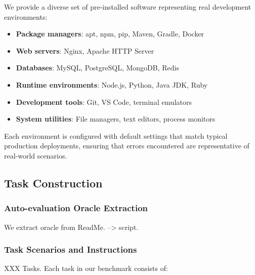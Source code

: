 
We provide a diverse set of pre-installed software representing real development environments:

\begin{itemize}
    \item \textbf{Package managers}: apt, npm, pip, Maven, Gradle, Docker
    \item \textbf{Web servers}: Nginx, Apache HTTP Server
    \item \textbf{Databases}: MySQL, PostgreSQL, MongoDB, Redis
    \item \textbf{Runtime environments}: Node.js, Python, Java JDK, Ruby
    \item \textbf{Development tools}: Git, VS Code, terminal emulators
    \item \textbf{System utilities}: File managers, text editors, process monitors
\end{itemize}

Each environment is configured with default settings that match typical production deployments, ensuring that errors encountered are representative of real-world scenarios.




\subsection{Task Construction}\label{sec:task-construction}


\subsubsection{Auto-evaluation Oracle Extraction}

We extract oracle from ReadMe. --> script.

\subsubsection{Task Scenarios and Instructions}

XXX Tasks. Each task in our benchmark consists of:

